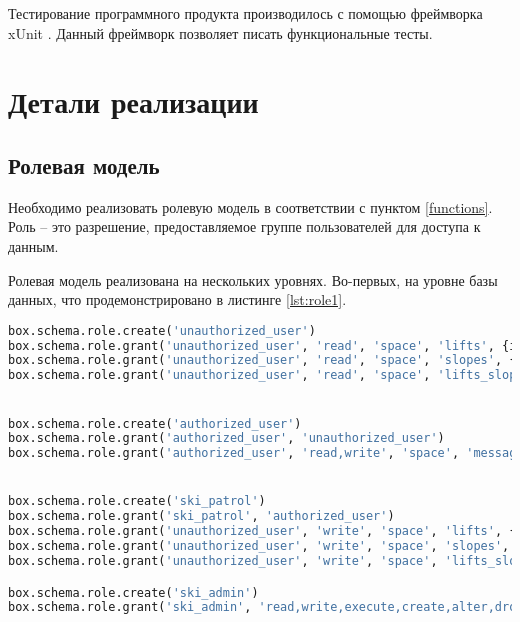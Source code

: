 Тестирование программного продукта производилось с помощью фреймворка xUnit \cite{test}. Данный фреймворк позволяет писать функциональные тесты. 

\section{Детали реализации}

\subsection{Ролевая модель}

Необходимо реализовать ролевую модель в соответствии с пунктом \ref{functions}. Роль – это разрешение, предоставляемое группе пользователей для доступа к данным. 

Ролевая модель реализована на нескольких уровнях. Во-первых, на уровне базы данных, что продемонстрировано в листинге \ref{lst:role1}. 

\captionsetup{justification=centering,singlelinecheck=off}
\begin{lstlisting}[label=lst:role1, caption=Ролевая модель на уровне БД, language=python]
box.schema.role.create('unauthorized_user')
box.schema.role.grant('unauthorized_user', 'read', 'space', 'lifts', {if_not_exists=true})
box.schema.role.grant('unauthorized_user', 'read', 'space', 'slopes', {if_not_exists=true})
box.schema.role.grant('unauthorized_user', 'read', 'space', 'lifts_slopes', {if_not_exists=true})


box.schema.role.create('authorized_user')
box.schema.role.grant('authorized_user', 'unauthorized_user')
box.schema.role.grant('authorized_user', 'read,write', 'space', 'messages', {if_not_exists=true})


box.schema.role.create('ski_patrol')
box.schema.role.grant('ski_patrol', 'authorized_user')
box.schema.role.grant('unauthorized_user', 'write', 'space', 'lifts', {if_not_exists=true})
box.schema.role.grant('unauthorized_user', 'write', 'space', 'slopes', {if_not_exists=true})
box.schema.role.grant('unauthorized_user', 'write', 'space', 'lifts_slopes', {if_not_exists=true})

box.schema.role.create('ski_admin')
box.schema.role.grant('ski_admin', 'read,write,execute,create,alter,drop', 'universe')
\end{lstlisting}